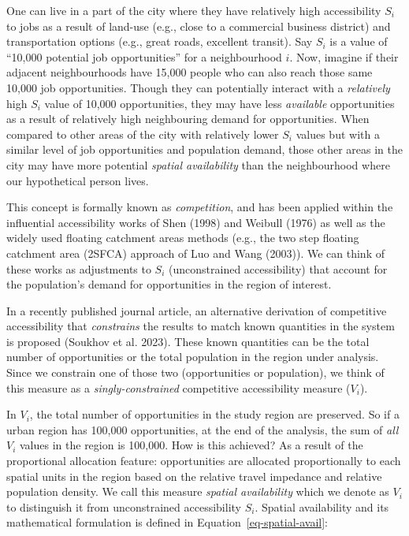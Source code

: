 \documentclass[12pt, oneside]{report}
\begin{document}
One can live in a part of the city where they have relatively high
accessibility \(S_i\) to jobs as a result of land-use (e.g., close to a
commercial business district) and transportation options (e.g., great
roads, excellent transit). Say \(S_i\) is a value of ``10,000 potential
job opportunities'' for a neighbourhood \(i\). Now, imagine if their
adjacent neighbourhoods have 15,000 people who can also reach those same
10,000 job opportunities. Though they can potentially interact with a
\emph{relatively} high \(S_i\) value of 10,000 opportunities, they may
have less \emph{available} opportunities as a result of relatively high
neighbouring demand for opportunities. When compared to other areas of
the city with relatively lower \(S_i\) values but with a similar level
of job opportunities and population demand, those other areas in the
city may have more potential \emph{spatial availability} than the
neighbourhood where our hypothetical person lives.

This concept is formally known as \emph{competition}, and has been
applied within the influential accessibility works of Shen (1998) and
Weibull (1976) as well as the widely used floating catchment areas
methods (e.g., the two step floating catchment area (2SFCA) approach of
Luo and Wang (2003)). We can think of these works as adjustments to
\(S_i\) (unconstrained accessibility) that account for the population's
demand for opportunities in the region of interest.

In a recently published journal article, an alternative derivation of
competitive accessibility that \emph{constrains} the results to match
known quantities in the system is proposed (Soukhov et al. 2023). These
known quantities can be the total number of opportunities or the total
population in the region under analysis. Since we constrain one of those
two (opportunities or population), we think of this measure as a
\emph{singly-constrained} competitive accessibility measure (\(V_i\)).

In \(V_i\), the total number of opportunities in the study region are
preserved. So if a urban region has 100,000 opportunities, at the end of
the analysis, the sum of \emph{all} \(V_i\) values in the region is
100,000. How is this achieved? As a result of the proportional
allocation feature: opportunities are allocated proportionally to each
spatial units in the region based on the relative travel impedance and
relative population density. We call this measure \emph{spatial
availability} which we denote as \(V_i\) to distinguish it from
unconstrained accessibility \(S_i\). Spatial availability and its
mathematical formulation is defined in Equation~\ref{eq-spatial-avail}:
\end{document}
